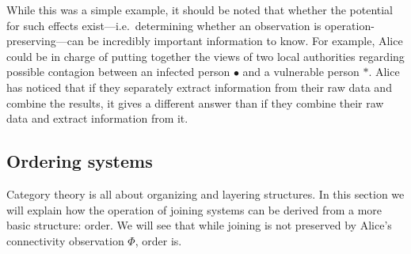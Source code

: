 \documentclass[7Sketches]{subfiles}
\begin{document}
While this was a simple example, it should be noted that whether the potential for such effects exist---i.e.\ determining whether an observation is operation-preserving---can be incredibly important information to know. For example, Alice could be in charge of putting together the views of two
local authorities regarding possible contagion between an infected person $\bullet$ and
a vulnerable person $\ast$. Alice has noticed that if they separately extract information from their raw data and combine the results, it gives a different answer than if they combine their raw data and extract information from it.

%
\subsection{Ordering systems}

Category theory is all about organizing and layering structures. In this section we will explain how the operation of joining systems can be derived from a more basic structure: order. We will see that while joining is not preserved by Alice's connectivity observation $\Phi$, order is.%
%
%
\end{document}
